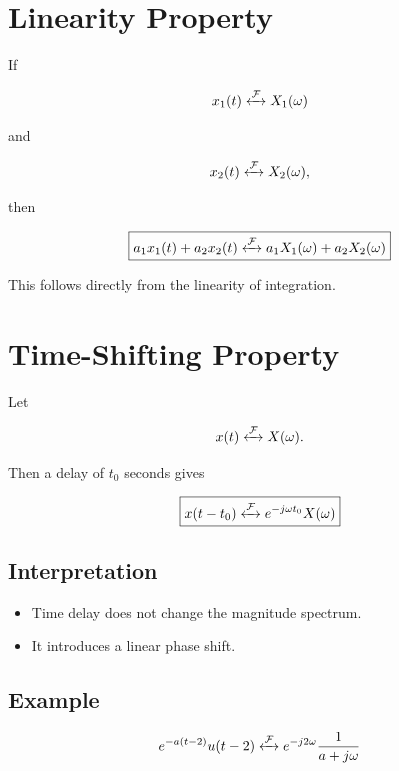 \section{Linearity Property}

If

\[
x_1(t)\xleftrightarrow{\mathcal{F}}X_1(\omega)
\]

and

\[
x_2(t)\xleftrightarrow{\mathcal{F}}X_2(\omega),
\]

then

\[
\boxed{
a_1x_1(t)+a_2x_2(t)
\xleftrightarrow{\mathcal{F}}
a_1X_1(\omega)+a_2X_2(\omega)
}
\]

This follows directly from the linearity of integration.


\section{Time-Shifting Property}

Let

\[
x(t)\xleftrightarrow{\mathcal{F}}X(\omega).
\]

Then a delay of \(t_0\) seconds gives

\[
\boxed{
x(t-t_0)
\xleftrightarrow{\mathcal{F}}
e^{-j\omega t_0}X(\omega)
}
\]


\subsection{Interpretation}

\begin{itemize}
\item Time delay does not change the magnitude spectrum.
\item It introduces a linear phase shift.
\end{itemize}


\subsection{Example}

\[
e^{-a(t-2)}u(t-2)
\xleftrightarrow{\mathcal{F}}
e^{-j2\omega}\frac{1}{a+j\omega}
\]

